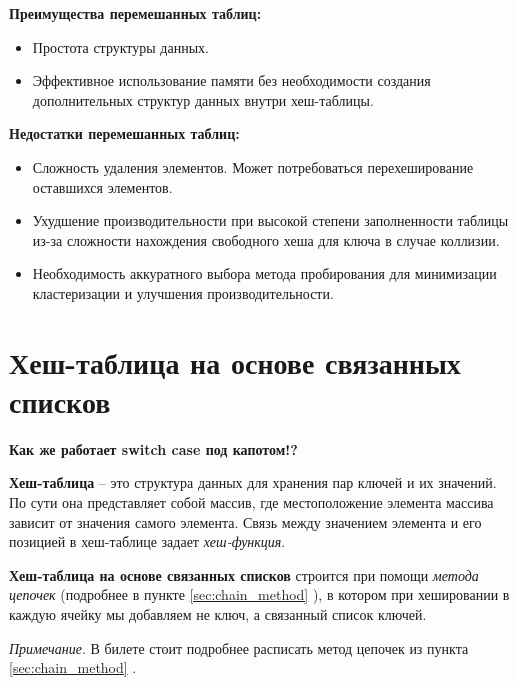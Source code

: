 \begin{minipage}[t]{0.45\textwidth}
	\textbf{Преимущества перемешанных таблиц:}
	\begin{itemize}[label=$\triangleright$, leftmargin=*, font=\scriptsize, noitemsep, topsep=0pt, , partopsep=0pt]
		\item {\footnotesize Простота структуры данных.}
		\item {\footnotesize Эффективное использование памяти без необходимости создания дополнительных структур данных внутри хеш-таблицы.}
	\end{itemize}
\end{minipage}
\hspace{1cm}
\begin{minipage}[t]{0.45\textwidth}
	\textbf{Недостатки перемешанных таблиц:}
	\begin{itemize}[label=$\triangleright$, leftmargin=*, font=\scriptsize, noitemsep, topsep=0pt, , partopsep=0pt]
		\item {\footnotesize Сложность удаления элементов. Может потребоваться перехеширование оставшихся элементов.}
		\item {\footnotesize Ухудшение производительности при высокой степени заполненности таблицы из-за сложности нахождения свободного хеша для ключа в случае коллизии.}
		\item {\footnotesize Необходимость аккуратного выбора метода пробирования для минимизации кластеризации и улучшения производительности.}
	\end{itemize}
\end{minipage}
\vspace{50pt}



\section{Хеш-таблица на основе связанных списков}
\vspace{-20pt} {\tiny \textbf{\qquad \qquad Как же работает switch case под капотом!?}}

\textbf{Хеш-таблица} -- это структура данных для хранения пар ключей и их значений. По сути она представляет собой массив, где местоположение элемента массива зависит от значения самого элемента. Связь между значением элемента и его позицией в хеш-таблице задает \textit{хеш-функция}.

\textbf{Хеш-таблица на основе связанных списков} строится при помощи \textit{метода цепочек} (подробнее в пункте \ref{sec:chain_method} ), в котором при хешировании в каждую ячейку мы добавляем не ключ, а связанный список ключей.\par
\vspace{5pt}
{\footnotesize \textit{Примечание}. В билете стоит подробнее расписать метод цепочек из пункта \ref{sec:chain_method} .}
\vspace{5pt}

